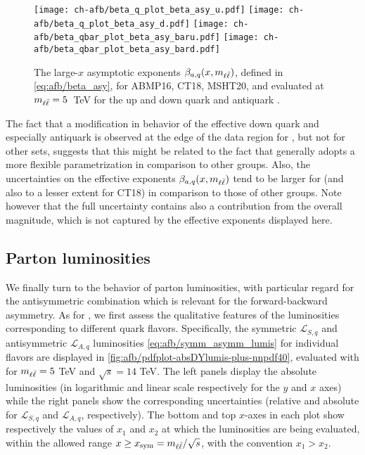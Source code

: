 \begin{figure}[!t]
 \centering
 \texttt{[image: ch-afb/beta\_q\_plot\_beta\_asy\_u.pdf]}
 \texttt{[image: ch-afb/beta\_q\_plot\_beta\_asy\_d.pdf]}
 \texttt{[image: ch-afb/beta\_qbar\_plot\_beta\_asy\_baru.pdf]}
 \texttt{[image: ch-afb/beta\_qbar\_plot\_beta\_asy\_bard.pdf]}
 \caption{\small 
   The large-$x$ asymptotic exponents $\beta_{a,q}(x,m_{\ell\bar{\ell}})$, defined in
   \cref{eq:afb/beta_asy}, for ABMP16, CT18, MSHT20, and  evaluated at
   $m_{\ell\bar{\ell}}=5$~TeV for the up and down quark and antiquark \pdfs.
 }
 \label{fig:afb/asy_exponents}
\end{figure}

The fact that a modification in behavior of the effective down quark
and especially antiquark \pdfs is observed at the edge of the data
region for , but not for other \pdf sets, suggests that this
might be related to the fact that   generally adopts a more
flexible \pdf parametrization in comparison to other groups.
%
Also, the  uncertainties on the effective exponents
$\beta_{a,q}(x,m_{\ell\bar{\ell}})$ tend to be larger for  (and also to a
lesser extent for CT18) in comparison to those of other groups.
Note however that the full \pdf uncertainty contains also a
contribution from the overall 
magnitude, which is not captured by the effective exponents displayed here.

\subsection{Parton luminosities}
\label{subsec:afb/partoniclumis}

We finally turn to the behavior of parton luminosities, with
particular regard for the antisymmetric combination which is relevant
for the forward-backward asymmetry.
As for \pdfs, we first assess the qualitative features of the
luminosities corresponding to different quark flavors.
Specifically, the symmetric $\mathcal{L}_{S,q}$ and antisymmetric
$\mathcal{L}_{A,q}$ luminosities
\cref{eq:afb/symm_asymm_lumis}  for individual flavors are
displayed in \cref{fig:afb/pdfplot-absDYlumis-plus-nnpdf40},
evaluated with  \nnlo for $m_{\ell\bar{\ell}}=5$ TeV and $\sqrt{s}=14$ TeV.
%
The left panels display the absolute luminosities (in logarithmic and
linear scale respectively
for the $y$ and $x$ axes)
while the right panels show the corresponding \pdf uncertainties (relative and absolute for
$\mathcal{L}_{S,q}$ and $\mathcal{L}_{A,q}$, respectively).
%
The bottom  and top $x$-axes in each plot show respectively the values
of $x_1$ and $x_2$  at which the
luminosities are being evaluated, within the allowed range
$x \ge x_{\rm sym}=m_{\ell\bar{\ell}}/\sqrt{s}$, with the convention $x_1>x_2$.

